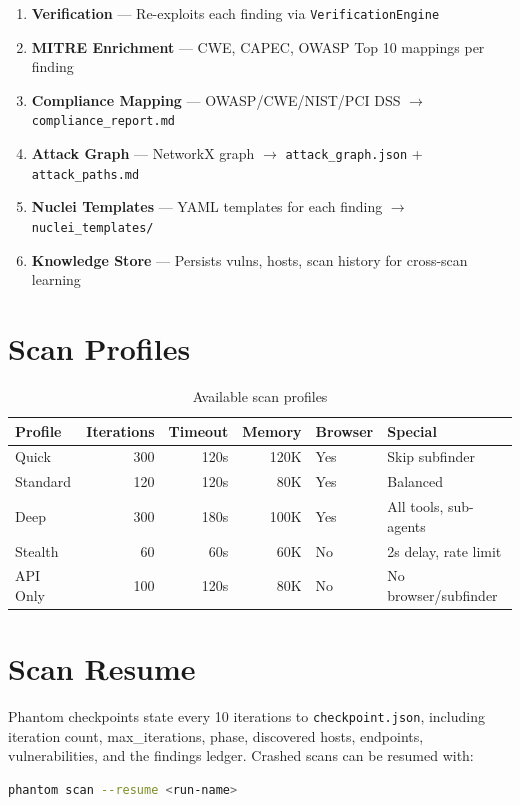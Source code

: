 \documentclass[12pt,a4paper]{report}
\begin{document}
\begin{enumerate}[noitemsep]
  \item \textbf{Verification} --- Re-exploits each finding via \texttt{VerificationEngine}
  \item \textbf{MITRE Enrichment} --- CWE, CAPEC, OWASP Top 10 mappings per finding
  \item \textbf{Compliance Mapping} --- OWASP/CWE/NIST/PCI DSS $\to$ \texttt{compliance\_report.md}
  \item \textbf{Attack Graph} --- NetworkX graph $\to$ \texttt{attack\_graph.json} + \texttt{attack\_paths.md}
  \item \textbf{Nuclei Templates} --- YAML templates for each finding $\to$ \texttt{nuclei\_templates/}
  \item \textbf{Knowledge Store} --- Persists vulns, hosts, scan history for cross-scan learning
\end{enumerate}

\section{Scan Profiles}
\begin{table}[H]
\centering
\caption{Available scan profiles}
\label{tab:profiles}
\begin{tabular}{lrrrll}
\toprule
\textbf{Profile} & \textbf{Iterations} & \textbf{Timeout} & \textbf{Memory} & \textbf{Browser} & \textbf{Special} \\
\midrule
Quick    & 300  & 120s & 120K & Yes & Skip subfinder \\
Standard & 120  & 120s & 80K  & Yes & Balanced \\
Deep     & 300  & 180s & 100K & Yes & All tools, sub-agents \\
Stealth  & 60   & 60s  & 60K  & No  & 2s delay, rate limit \\
API Only & 100  & 120s & 80K  & No  & No browser/subfinder \\
\bottomrule
\end{tabular}
\end{table}

\section{Scan Resume}
Phantom checkpoints state every 10 iterations to \texttt{checkpoint.json},
including iteration count, max\_iterations, phase, discovered hosts, endpoints,
vulnerabilities, and the findings ledger. Crashed scans can be resumed with:
\begin{lstlisting}[language=bash]
phantom scan --resume <run-name>
\end{lstlisting}
\end{document}
